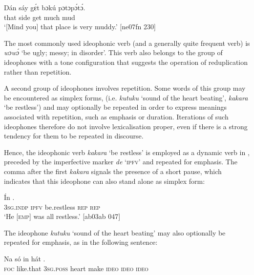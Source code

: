 \ea%
    \label{ex:key:1617}
    \gll Dán  sáy  gɛ́t  bɔkú  pɔtɔpɔ́tɔ́.\\
that  side  get  much  mud  \\

\glt ‘[Mind you] that place is very muddy.’ [ne07fn 230]
\z

The most commonly used ideophonic verb (and a generally quite frequent verb) is \textit{wɔwɔ́} ‘be ugly; messy; in disorder’. This verb also belongs to the group of ideophones with a tone configuration that suggests the operation of reduplication rather than repetition. 

A second group of ideophones involves repetition. Some words of this group may be encountered as simplex forms, (i.e. \textit{kutuku} ‘sound of the heart beating’, \textit{kakara} ‘be restless’) and may optionally be repeated in order to express meanings associated with repetition, such as emphasis or duration. Iterations of such ideophones therefore do not involve lexicalisation proper, even if there is a strong tendency for them to be repeated in discourse. 


Hence, the ideophonic verb \textit{kakara} ‘be restless’ is employed as a dynamic verb in , preceded by the imperfective marker \textit{de} ‘\textsc{ipfv}’ and repeated for emphasis. The comma after the first \textit{kakara} signals the presence of a short pause, which indicates that this ideophone can also stand alone as simplex form: 



\ea%
    \label{ex:key:1618}
    \gll \'{I}n            .\\
\textsc{3sg.indp}  \textsc{ipfv}  be.restless  \textsc{rep}    \textsc{rep}\\

\glt ‘He [\textsc{emp}] was all restless.’ [ab03ab 047]
\z

The ideophone \textit{kutuku} ‘sound of the heart beating’ may also optionally be repeated for emphasis, as in the following sentence: 


\ea%
    \label{ex:key:1619}
    \gll Na  só    in    hát            .\\
\textsc{foc}  like.that  \textsc{3sg.poss}  heart  make  \textsc{ideo}    \textsc{ideo}    \textsc{ideo}\\

